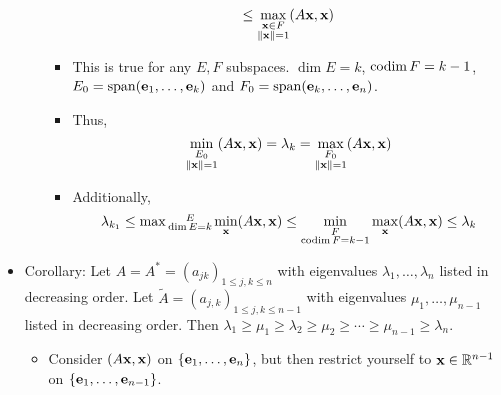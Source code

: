 \documentclass[../../notes.tex]{subfiles}
\begin{document}
\begin{itemize}
\begin{itemize}
\begin{itemize}
\begin{equation*}
                \leq \max_{\substack{\mathbf{x}\in F\\\norm{\mathbf{x}}=1}}(A\mathbf{x},\mathbf{x})
            \end{equation*}
            \item This is true for any $E,F$ subspaces. $\dim E=k$, $\operatorname{codim} F=k-1$, $E_0=\operatorname{span}(\mathbf{e}_1,\dots,\mathbf{e}_k)$ and $F_0=\operatorname{span}(\mathbf{e}_k,\dots,\mathbf{e}_n)$.
            \item Thus,
            \begin{equation*}
                \min_{\substack{E_0\\\norm{\mathbf{x}}=1}}(A\mathbf{x},\mathbf{x}) = \lambda_k
                = \max_{\substack{F_0\\\norm{\mathbf{x}}=1}}(A\mathbf{x},\mathbf{x})
            \end{equation*}
            \item Additionally,
            \begin{equation*}
                \lambda_{k_1} \leq \max{\substack{E\\\dim E=k}}\min_{\mathbf{x}}(A\mathbf{x},\mathbf{x})
                \leq \min_{\substack{F\\\operatorname{codim} F=k-1}}\max_{\mathbf{x}}(A\mathbf{x},\mathbf{x})
                \leq \lambda_k
            \end{equation*}
        \end{itemize}
    \end{itemize}
    \item Corollary: Let $A=A^*=(a_{jk})_{1\leq j,k\leq n}$ with eigenvalues $\lambda_1,\dots,\lambda_n$ listed in decreasing order. Let $\tilde{A}=(a_{j,k})_{1\leq j,k\leq n-1}$ with eigenvalues $\mu_1,\dots,\mu_{n-1}$ listed in decreasing order. Then $\lambda_1\geq\mu_1\geq\lambda_2\geq\mu_2\geq\cdots\geq\mu_{n-1}\geq\lambda_n$.
    \begin{itemize}
        \item Consider $(A\mathbf{x},\mathbf{x})$ on $\{\mathbf{e}_1,\dots,\mathbf{e}_n\}$, but then restrict yourself to $\mathbf{x}\in\mathbb{R}^{n-1}$ on $\{\mathbf{e}_1,\dots,\mathbf{e}_{n-1}\}$.
    \end{itemize}
\end{itemize}
\end{document}
